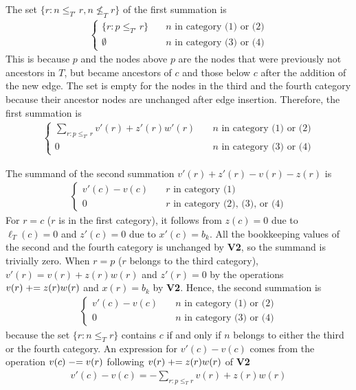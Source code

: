 The set $\{r: n \le_{T'} r, n \nleq_T r\}$ of the first summation is
\begin{align}
    \begin{cases}
         \{r: p \le_{T'} r\} & \quad \text{$n$ in category (1) or (2)} \\
        \emptyset & \quad \text{$n$ in category (3) or (4)}
    \end{cases}
\end{align}
This is because $p$ and the nodes above $p$ are the nodes that were previously not ancestors in $T$, but became ancestors of $c$ and those below $c$ after the addition of the new edge.
The set is empty for the nodes in the third and the fourth category because their ancestor nodes are unchanged after edge insertion.
Therefore, the first summation is
\begin{align}
    \begin{cases}
        \sum_{r: p \le_{T'} r} v'(r) + z'(r)w'(r) & \quad \text{$n$ in category (1) or (2)} \\
        0 & \quad \text{$n$ in category (3) or (4)}
    \end{cases}
\end{align}

The summand of the second summation $v'(r) + z'(r) - v(r) - z(r)$ is
\begin{align}
    \begin{cases}
    v'(c) - v(c) & \quad \text{$r$ in category (1)} \\
    0 & \quad  \text{$r$ in category (2), (3), or (4)}
    \end{cases} 
\end{align}
For $r=c$ ($r$ is in the first category), it follows from $z(c)=0$ due to $\ell_T(c)=0$ and $z'(c)=0$ due to $x'(c)=b_k$.
All the bookkeeping values of the second and the fourth category is unchanged by \textbf{V2}, so the summand is trivially zero.
When $r=p$ ($r$ belongs to the third category), $v'(r) = v(r) + z(r)w(r)$  and $z'(r)=0$ by the operations $v(r) \mathrel{+}= z(r)w(r)$ and $x(r)=b_k$ by \textbf{V2}.
Hence, the second summation is
\begin{align}
    \begin{cases}
        v'(c) - v(c) & \quad \text{$n$ in category (1) or (2)} \\
        0 & \quad \text{$n$ in category (3) or (4)}
    \end{cases}
\end{align}
because the set $\{r: n \le_T r\}$ contains $c$ if and only if $n$ belongs to either the third or the fourth category.
An expression for $v'(c)-v(c)$ comes from the operation $v(c) \mathrel{-}= v(r)$ following $v(r) \mathrel{+}= z(r)w(r)$ of \textbf{V2}
\begin{align}
    v'(c) - v(c) = - \sum_{r: p \le_{T} r} v(r) + z(r)w(r)
\end{align}

